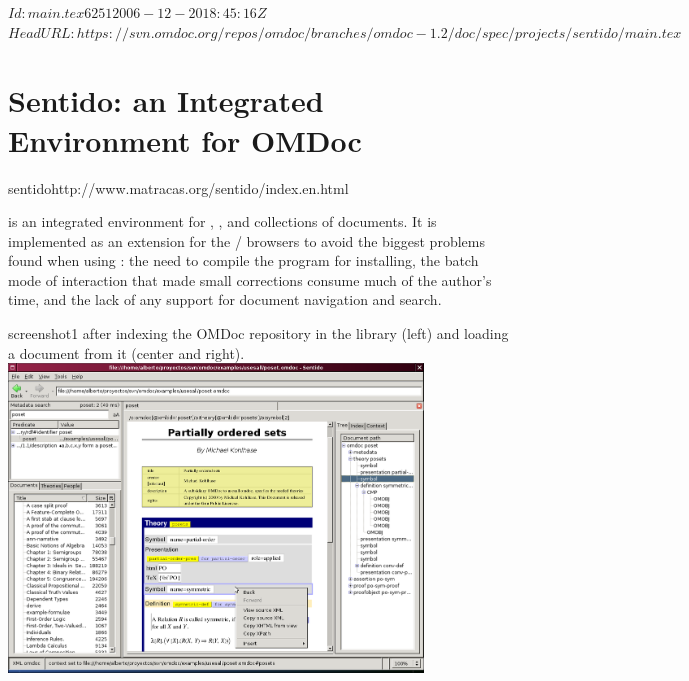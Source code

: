 \svnInfo $Id: main.tex 6251 2006-12-20 18:45:16Z  $
\svnKeyword $HeadURL: https://svn.omdoc.org/repos/omdoc/branches/omdoc-1.2/doc/spec/projects/sentido/main.tex $

\section[Sentido Integrated Environment]{Sentido: an Integrated Environment for OMDoc}
\begin{project}{sentido}{http://www.matracas.org/sentido/index.en.html}
\end{project}

{\sentido} is an integrated environment for {}, {},
and {} collections of {\omdoc} documents.
It is implemented as an extension for the {\mozilla}/{\firefox} browsers
to avoid the biggest problems found when using {\qmath}:
the need to compile the program for installing, the batch mode of interaction
that made small corrections consume much of the author's time,
and the lack of any support for document navigation and search.

\begin{myfig}{screenshot1}{{\sentido} after indexing the OMDoc repository in the library (left) and
    loading a document from it (center and right).}
  \includegraphics[width=11cm]{projects/sentido/sentido_general_poset}
\end{myfig}

